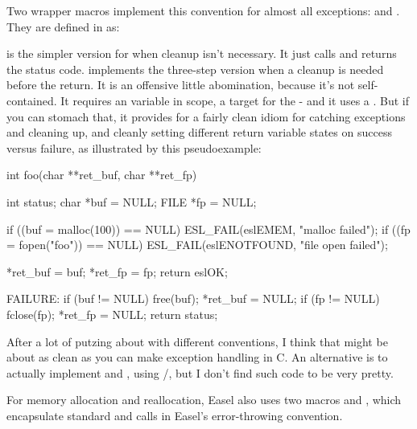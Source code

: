 Two wrapper macros implement this convention for almost all
exceptions:  and . They are
defined in  as:

\begin{cchunk}

\end{cchunk}

 is the simpler version for when cleanup isn't
necessary. It just calls  and returns the status
code.  implements the three-step version when a
cleanup is needed before the return. It is an offensive little
abomination, because it's not self-contained. It requires an
 variable in scope, a  target for
the  - and it uses a . But if you can stomach
that, it provides for a fairly clean idiom for catching exceptions and
cleaning up, and cleanly setting different return variable states on
success versus failure, as illustrated by this pseudoexample:

\begin{cchunk}
int 
foo(char **ret_buf, char **ret_fp)
{
    int status;
    char *buf = NULL;
    FILE *fp  = NULL;

    if ((buf = malloc(100))  == NULL) ESL_FAIL(eslEMEM,      "malloc failed");
    if ((fp  = fopen("foo")) == NULL) ESL_FAIL(eslENOTFOUND, "file open failed");

    *ret_buf = buf;
    *ret_fp  = fp;
    return eslOK;

  FAILURE:
    if (buf != NULL) free(buf);  *ret_buf = NULL;
    if (fp  != NULL) fclose(fp); *ret_fp  = NULL;
    return status;
}
\end{cchunk}

After a lot of putzing about with different conventions, I think that
might be about as clean as you can make exception handling in C. An
alternative is to actually implement  and ,
using /, but I don't find such code
to be very pretty.

For memory allocation and reallocation, Easel also uses two macros
 and , which encapsulate
standard  and  calls in Easel's
error-throwing convention.


